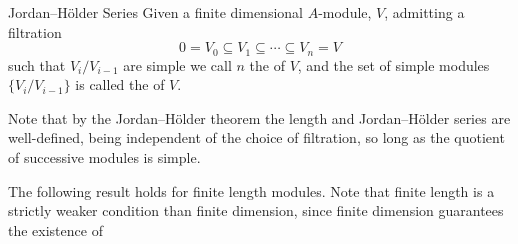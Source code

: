 \documentclass[fleqn]{NotesClass}
\begin{document}
    \begin{dfn}{Jordan--H\"older Series}{}
        Given a finite dimensional \(A\)-module, \(V\), admitting a filtration
        \begin{equation}
            0 = V_0 \subseteq V_1 \subseteq \dotsb \subseteq V_n = V
        \end{equation}
        such that \(V_i/V_{i-1}\) are simple we call \(n\) the  of \(V\), and the set of simple modules \(\{V_i/V_{i-1}\}\) is called the  of \(V\).
    \end{dfn}
    
    Note that by the Jordan--H\"older theorem the length and Jordan--H\"older series are well-defined, being independent of the choice of filtration, so long as the quotient of successive modules is simple.
    
    The following result holds for finite length modules.
    Note that finite length is a strictly weaker condition than finite dimension, since finite dimension guarantees the existence of 
    
\end{document}
